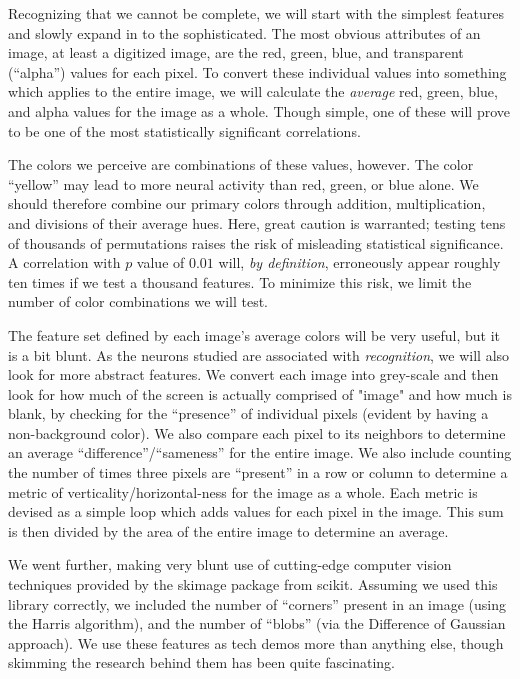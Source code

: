 \documentclass{scrartcl}
\begin{document}
Recognizing that we cannot be complete, we will start with the simplest
features and slowly expand in to the sophisticated. The most obvious
attributes of an image, at least a digitized image, are the red, green, blue,
and transparent (``alpha'') values for each pixel. To convert these individual
values into something which applies to the entire image, we will calculate the
{\em average} red, green, blue, and alpha values for the image as a whole.
Though simple, one of these will prove to be one of the most statistically
significant correlations.

The colors we perceive are combinations of these values, however. The color
``yellow'' may lead to more neural activity than red, green, or blue alone. We
should therefore combine our primary colors through addition, multiplication,
and divisions of their average hues. Here, great caution is warranted; testing
tens of thousands of permutations raises the risk of misleading statistical
significance. A correlation with $p$ value of $0.01$ will, {\em by
definition}, erroneously appear roughly ten times if we test a thousand
features. To minimize this risk, we limit the number of color combinations we
will test.

The feature set defined by each image's average colors will be very useful,
but it is a bit blunt. As the neurons studied are associated with {\em
recognition}, we will also look for more abstract features. We convert each
image into grey-scale and then look for how much of the screen is actually
comprised of "image" and how much is blank, by checking for the ``presence''
of individual pixels (evident by having a non-background color). We also
compare each pixel to its neighbors to determine an average
``difference''/``sameness'' for the entire image. We also include counting the
number of times three pixels are ``present'' in a row or column to determine a
metric of verticality/horizontal-ness for the image as a whole. Each metric is
devised as a simple loop which adds values for each pixel in the image. This
sum is then divided by the area of the entire image to determine an average.

We went further, making very blunt use of cutting-edge computer vision
techniques provided by the {\ttfamily skimage} package from scikit. Assuming
we used this library correctly, we included the number of ``corners'' present
in an image (using the Harris algorithm), and the number of ``blobs'' (via the
Difference of Gaussian approach). We use these features as tech demos more
than anything else, though skimming the research behind them has been quite
fascinating.
\end{document}
